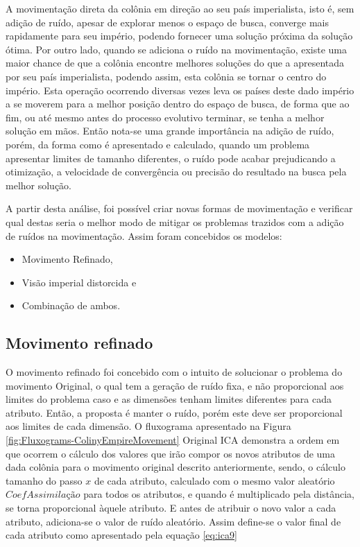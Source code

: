 A movimentação direta da colônia em direção ao seu país imperialista, isto é, sem adição de ruído, apesar de explorar menos o espaço de busca, converge mais rapidamente para seu império, podendo fornecer uma solução próxima da solução ótima. Por outro lado, quando se adiciona o ruído na movimentação, existe uma maior chance de que a colônia encontre melhores soluções do que a apresentada por seu país imperialista, podendo assim, esta colônia se tornar o centro do império. Esta operação ocorrendo diversas vezes leva os países deste dado império a se moverem para a melhor posição dentro do espaço de busca, de forma que ao fim, ou até mesmo antes do processo evolutivo terminar, se tenha a melhor solução em mãos. Então nota-se uma grande importância na adição de ruído, porém, da forma como é apresentado e calculado, quando um problema apresentar limites de tamanho diferentes, o ruído pode acabar prejudicando a otimização, a velocidade de convergência ou precisão do resultado na busca pela melhor solução.

A partir desta análise, foi possível criar novas formas de movimentação e verificar qual destas seria o melhor modo de mitigar os problemas trazidos com a adição de ruídos na movimentação. Assim foram concebidos os modelos:
\begin{itemize}
\item Movimento Refinado,
\item Visão imperial distorcida e 
\item Combinação de ambos.
\end{itemize}







\subsection{Movimento refinado}
\label{Movimento refinado}

O movimento refinado foi concebido com o intuito de solucionar o problema do movimento Original, o qual tem a geração de ruído fixa, e não proporcional aos limites do problema caso e as dimensões tenham limites diferentes para cada atributo. Então, a proposta é manter o ruído, porém este deve ser proporcional aos limites de cada dimensão. O fluxograma apresentado na Figura \ref{fig:Fluxograms-ColinyEmpireMovement} Original ICA demonstra a ordem em que ocorrem o cálculo dos valores que irão compor os novos atributos de uma dada colônia para o movimento original descrito anteriormente, sendo, o cálculo tamanho do passo \(x\) de cada atributo, calculado com o mesmo valor aleatório \(CoefAssimilação\) para todos os atributos, e quando é multiplicado pela distância, se torna proporcional àquele atributo. E antes de atribuir o novo valor a cada atributo, adiciona-se o valor de ruído aleatório. Assim define-se o valor final de cada atributo como apresentado pela equação \ref{eq:ica9}
	
